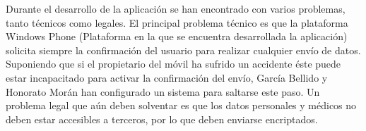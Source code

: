 Durante el desarrollo de la aplicación se han encontrado con varios problemas, tanto técnicos como legales. El principal problema técnico es que la plataforma Windows Phone (Plataforma en la que se encuentra desarrollada la aplicación) solicita siempre la confirmación del usuario para realizar cualquier envío de datos. Suponiendo que si el propietario del móvil ha sufrido un accidente éste puede estar incapacitado para activar la confirmación del envío, García Bellido y Honorato Morán han configurado un sistema para saltarse este paso. Un problema legal que aún deben solventar es que los datos personales y médicos no deben estar accesibles a terceros, por lo que deben enviarse encriptados.



%	
%	
